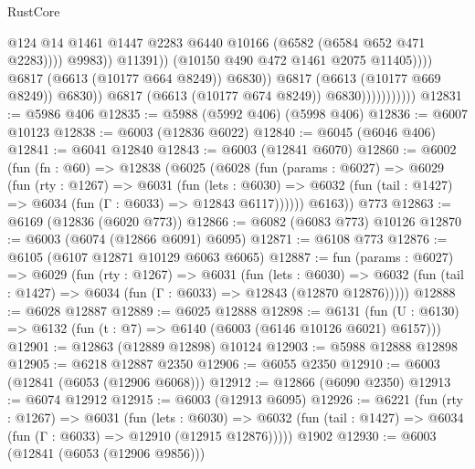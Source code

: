 \begin{lexlean}{RustCore}
\begin{coremodule}
                                                    @124
                                                    @14
                                                    @1461
                                                    @1447
                                                    @2283
                                                    @6440
                                                    @10166
                                                    (@6582 (@6584 @652 @471 @2283))))
                                                @9983))
                                            @11391))
                                        (@10150 @490 @472 @1461 @2075 @11405))))
                                  @6817
                                  (@6613 (@10177 @664 @8249))
                                  @6830))
                              @6817
                              (@6613 (@10177 @669 @8249))
                              @6830))
                          @6817
                          (@6613 (@10177 @674 @8249))
                          @6830)))))))))))
@12831 := @5986 @406
@12835 := @5988 (@5992 @406) (@5998 @406)
@12836 := @6007 @10123
@12838 := @6003 (@12836 @6022)
@12840 := @6045 (@6046 @406)
@12841 := @6041 @12840
@12843 := @6003 (@12841 @6070)
@12860 := @6002
    (fun (fn : @60) =>
    @12838
      (@6025
        (@6028
          (fun (params : @6027) =>
          @6029
            (fun (rty : @1267) =>
            @6031
              (fun (lets : @6030) =>
              @6032 (fun (tail : @1427) => @6034 (fun (Γ : @6033) => @12843 @6117))))))
        @6163))
    @773
@12863 := @6169 (@12836 (@6020 @773))
@12866 := @6082 (@6083 @773) @10126
@12870 := @6003 (@6074 (@12866 @6091) @6095)
@12871 := @6108 @773
@12876 := @6105 (@6107 @12871 @10129 @6063 @6065)
@12887 := fun (params : @6027) =>
  @6029
    (fun (rty : @1267) =>
    @6031
      (fun (lets : @6030) =>
      @6032 (fun (tail : @1427) => @6034 (fun (Γ : @6033) => @12843 (@12870 @12876)))))
@12888 := @6028 @12887
@12889 := @6025 @12888
@12898 := @6131
    (fun (U : @6130) => @6132 (fun (t : @7) => @6140 (@6003 (@6146 @10126 @6021) @6157)))
@12901 := @12863 (@12889 @12898) @10124
@12903 := @5988 @12888 @12898
@12905 := @6218 @12887 @2350
@12906 := @6055 @2350
@12910 := @6003 (@12841 (@6053 (@12906 @6068)))
@12912 := @12866 (@6090 @2350)
@12913 := @6074 @12912
@12915 := @6003 (@12913 @6095)
@12926 := @6221
    (fun (rty : @1267) =>
    @6031
      (fun (lets : @6030) =>
      @6032 (fun (tail : @1427) => @6034 (fun (Γ : @6033) => @12910 (@12915 @12876)))))
    @1902
@12930 := @6003 (@12841 (@6053 (@12906 @9856)))

\end{coremodule}
\end{lexlean}
